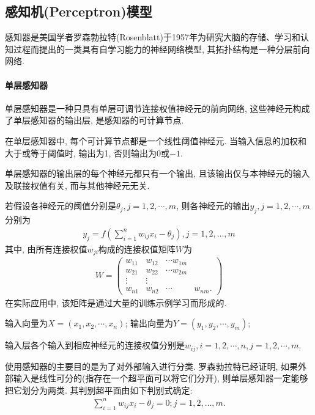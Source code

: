 \subsection{感知机(Perceptron)模型}
感知器是美国学者罗森勃拉特(Rosenblatt)于1957年为研究大脑的存储、学习和认知过程而提出的一类具有自学习能力的神经网络模型, 其拓扑结构是一种分层前向网络.
\paragraph{单层感知器}
单层感知器是一种只具有单层可调节连接权值神经元的前向网络, 这些神经元构成了单层感知器的输出层, 是感知器的可计算节点.

在单层感知器中, 每个可计算节点都是一个线性阈值神经元. 当输入信息的加权和大于或等于阈值时, 输出为1, 否则输出为0或$-1$.

单层感知器的输出层的每个神经元都只有一个输出, 且该输出仅与本神经元的输入及联接权值有关, 而与其他神经元无关.

若假设各神经元的阈值分别是$\theta_j, j=1,2,\cdots,m$, 则各神经元的输出$y_j, j=1,2,\cdots,m$分别为
\begin{align}
  {y}_{{j}}={f}\left(\sum_{{i}=1}^{{n}} w_{{ij}} {x}_{{i}}-\theta_{{j}}\right), {j}=1,2, \ldots, {m}
\end{align}
其中, 由所有连接权值$w_{ji}$构成的连接权值矩阵$W$为
\begin{align}
W=\left(
\begin{array}{llll}
{w_{11}} & {w_{12}} & {\cdots w_{1 {m}}} \\
{w_{21}} & {w_{22}} & {\cdots w_{2 {m}}} \\
{\vdots} & {\vdots} & {} \\
{w_{{n} 1}} & {w_{{n} 2}} & {\cdots} & {w_{{nm}}}.
\end{array}
\right)
\end{align}
在实际应用中, 该矩阵是通过大量的训练示例学习而形成的.

输入向量为$X=(x_1,x_2,\cdots,x_n)$; 输出向量为$Y=(y_1,y_2,\cdots,y_m)$;

输入层各个输入到相应神经元的连接权值分别是$w_{ij},i=1,2,\cdots,n, j=1,2,\cdots, m$.

使用感知器的主要目的是为了对外部输入进行分类. 罗森勃拉特已经证明, 如果外部输入是线性可分的(指存在一个超平面可以将它们分开), 则单层感知器一定能够把它划分为两类. 其判别超平面由如下判别式确定:
\begin{align}
  \sum_{i=1}^{n} w_{i j} x_{i}-\theta_{j}=0; j=1,2, \ldots, m.
\end{align}

